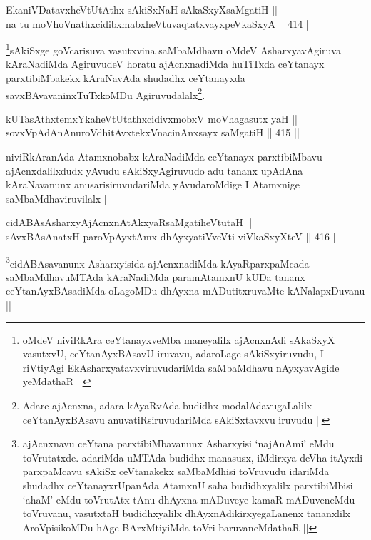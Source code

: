 
\begin{shl}
EkaniVDatavxheVtUtAthx sAkiSxNaH sAkaSxyXsaMgatiH || \\
na tu moVhoVnathxcidibxmabxheVtuvaqtatxvayxpeVkaSxyA ||  414 ||  
\end{shl}

\begin{artha}
\footnote{oMdeV niviRkAra ceYtanayxveMba maneyalilx ajAcnxnAdi sAkaSxyX vasutxvU, ceYtanAyxBAsavU iruvavu, adaroLage sAkiSxyiruvudu, I riVtiyAgi EkAsharxyatavxviruvudariMda saMbaMdhavu nAyxyavAgide yeMdathaR ||}sAkiSxge goVcarisuva vasutxvina saMbaMdhavu oMdeV AsharxyavAgiruva kAraNadiMda AgiruvudeV horatu ajAcnxnadiMda huTiTxda ceYtanayx parxtibiMbakekx kAraNavAda shudadhx ceYtanayxda savxBAvavaninxTuTxkoMDu Agiruvudalalx\footnote{Adare ajAcnxna, adara kAyaRvAda budidhx modalAdavugaLalilx ceYtanAyxBAsavu anuvatiRsiruvudariMda sAkiSxtavxvu iruvudu ||}.
\end{artha}

\begin{shl}
kUTasAthxtemxYkaheVtUtathxcidivxmobxV moVhagasutx yaH || \\
sovxVpAdAnAnuroVdhitAvxtekxVnacinAnxsayx saMgatiH ||  415 || 
\end{shl}

\begin{artha}
niviRkAranAda Atamxnobabx kAraNadiMda ceYtanayx parxtibiMbavu ajAcnxdalilxdudx yAvudu sAkiSxyAgiruvudo adu tananx upAdAna kAraNavanunx anusarisiruvudariMda yAvudaroMdige I Atamxnige saMbaMdhaviruvilalx ||
\end{artha}


\begin{shl}
cidABAsAsharxyAjAcnxnAtAkxyaRsaMgatiheVtutaH || \\
sAvxBAsAnatxH paroV\s pAyxtAmx dhAyxyatiVveVti viVkaSxyXteV ||  416 ||  
\end{shl}

\begin{artha}
\footnote{ajAcnxnavu ceYtana parxtibiMbavanunx Asharxyisi `najAnAmi' eMdu toVrutatxde. adariMda uMTAda budidhx manasusx, iMdirxya deVha itAyxdi parxpaMcavu sAkiSx ceVtanakekx saMbaMdhisi toVruvudu idariMda shudadhx ceYtanayxrUpanAda AtamxnU saha budidhxyalilx parxtibiMbisi `ahaM' eMdu toVrutAtx tAnu dhAyxna mADuveye kamaR mADuveneMdu toVruvanu, vasutxtaH budidhxyalilx dhAyxnAdikirxyegaLanenx tananxlilx AroVpisikoMDu hAge BArxMtiyiMda toVri baruvaneMdathaR ||}cidABAsavanunx Asharxyisida ajAcnxnadiMda kAyaRparxpaMcada saMbaMdhavuMTAda kAraNadiMda paramAtamxnU kUDa tananx ceYtanAyxBAsadiMda oLagoMDu dhAyxna mADutitxruvaMte kANalapxDuvanu ||
\end{artha}

